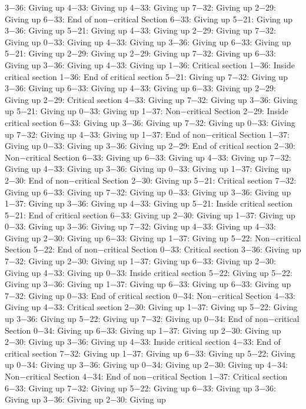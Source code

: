 3−36: Giving up
4−33: Giving up
4−33: Giving up
7−32: Giving up
2−29: Giving up
6−33: End of non−critical Section
6−33: Giving up
5−21: Giving up
3−36: Giving up
5−21: Giving up
4−33: Giving up
2−29: Giving up
7−32: Giving up
0−33: Giving up
4−33: Giving up
3−36: Giving up
6−33: Giving up
5−21: Giving up
2−29: Giving up
2−29: Giving up
7−32: Giving up
6−33: Giving up
3−36: Giving up
4−33: Giving up
1−36: Critical section
1−36: Inside critical section
1−36: End of critical section
5−21: Giving up
7−32: Giving up
3−36: Giving up
6−33: Giving up
4−33: Giving up
6−33: Giving up
2−29: Giving up
2−29: Critical section
4−33: Giving up
7−32: Giving up
3−36: Giving up
5−21: Giving up
0−33: Giving up
1−37: Non−critical Section
2−29: Inside critical section
6−33: Giving up
3−36: Giving up
7−32: Giving up
0−33: Giving up
7−32: Giving up
4−33: Giving up
1−37: End of non−critical Section
1−37: Giving up
0−33: Giving up
3−36: Giving up
2−29: End of critical section
2−30: Non−critical Section
6−33: Giving up
6−33: Giving up
4−33: Giving up
7−32: Giving up
4−33: Giving up
3−36: Giving up
0−33: Giving up
1−37: Giving up
2−30: End of non−critical Section
2−30: Giving up
5−21: Critical section
7−32: Giving up
6−33: Giving up
7−32: Giving up
0−33: Giving up
3−36: Giving up
1−37: Giving up
3−36: Giving up
4−33: Giving up
5−21: Inside critical section
5−21: End of critical section
6−33: Giving up
2−30: Giving up
1−37: Giving up
0−33: Giving up
3−36: Giving up
7−32: Giving up
4−33: Giving up
4−33: Giving up
2−30: Giving up
6−33: Giving up
1−37: Giving up
5−22: Non−critical Section
5−22: End of non−critical Section
0−33: Critical section
3−36: Giving up
7−32: Giving up
2−30: Giving up
1−37: Giving up
6−33: Giving up
2−30: Giving up
4−33: Giving up
0−33: Inside critical section
5−22: Giving up
5−22: Giving up
3−36: Giving up
1−37: Giving up
6−33: Giving up
6−33: Giving up
7−32: Giving up
0−33: End of critical section
0−34: Non−critical Section
4−33: Giving up
4−33: Critical section
2−30: Giving up
1−37: Giving up
5−22: Giving up
3−36: Giving up
5−22: Giving up
7−32: Giving up
0−34: End of non−critical Section
0−34: Giving up
6−33: Giving up
1−37: Giving up
2−30: Giving up
2−30: Giving up
3−36: Giving up
4−33: Inside critical section
4−33: End of critical section
7−32: Giving up
1−37: Giving up
6−33: Giving up
5−22: Giving up
0−34: Giving up
3−36: Giving up
0−34: Giving up
2−30: Giving up
4−34: Non−critical Section
4−34: End of non−critical Section
1−37: Critical section
6−33: Giving up
7−32: Giving up
5−22: Giving up
6−33: Giving up
3−36: Giving up
3−36: Giving up
2−30: Giving up
